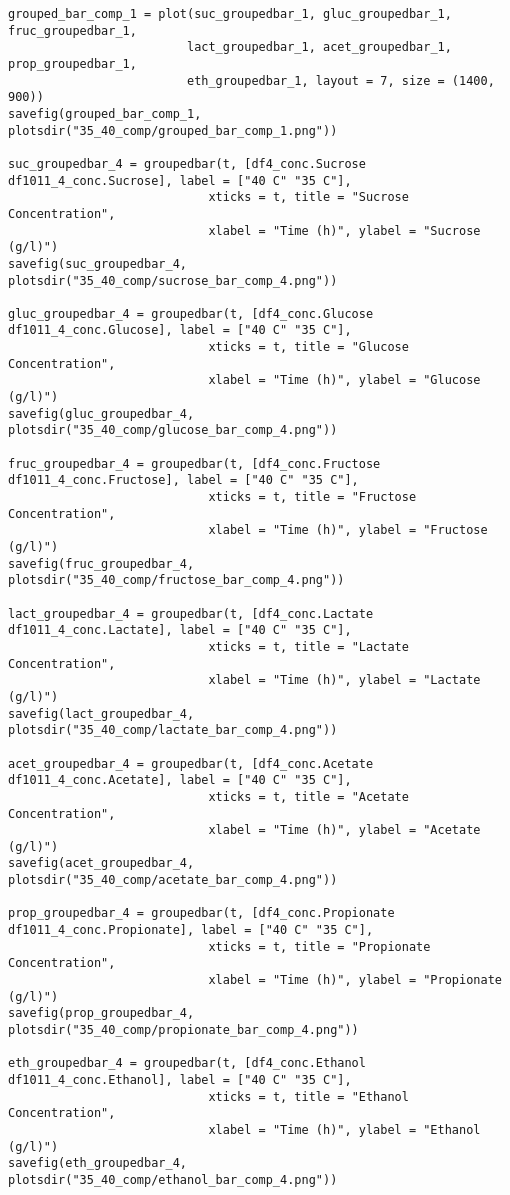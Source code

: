 \documentclass[11pt]{article}
\begin{document}
\begin{verbatim}
grouped_bar_comp_1 = plot(suc_groupedbar_1, gluc_groupedbar_1, fruc_groupedbar_1,
                         lact_groupedbar_1, acet_groupedbar_1, prop_groupedbar_1,
                         eth_groupedbar_1, layout = 7, size = (1400, 900))
savefig(grouped_bar_comp_1, plotsdir("35_40_comp/grouped_bar_comp_1.png"))

suc_groupedbar_4 = groupedbar(t, [df4_conc.Sucrose df1011_4_conc.Sucrose], label = ["40 C" "35 C"],
                            xticks = t, title = "Sucrose Concentration",
                            xlabel = "Time (h)", ylabel = "Sucrose (g/l)")
savefig(suc_groupedbar_4, plotsdir("35_40_comp/sucrose_bar_comp_4.png"))

gluc_groupedbar_4 = groupedbar(t, [df4_conc.Glucose df1011_4_conc.Glucose], label = ["40 C" "35 C"],
                            xticks = t, title = "Glucose Concentration",
                            xlabel = "Time (h)", ylabel = "Glucose (g/l)")
savefig(gluc_groupedbar_4, plotsdir("35_40_comp/glucose_bar_comp_4.png"))

fruc_groupedbar_4 = groupedbar(t, [df4_conc.Fructose df1011_4_conc.Fructose], label = ["40 C" "35 C"],
                            xticks = t, title = "Fructose Concentration",
                            xlabel = "Time (h)", ylabel = "Fructose (g/l)")
savefig(fruc_groupedbar_4, plotsdir("35_40_comp/fructose_bar_comp_4.png"))

lact_groupedbar_4 = groupedbar(t, [df4_conc.Lactate df1011_4_conc.Lactate], label = ["40 C" "35 C"],
                            xticks = t, title = "Lactate Concentration",
                            xlabel = "Time (h)", ylabel = "Lactate (g/l)")
savefig(lact_groupedbar_4, plotsdir("35_40_comp/lactate_bar_comp_4.png"))

acet_groupedbar_4 = groupedbar(t, [df4_conc.Acetate df1011_4_conc.Acetate], label = ["40 C" "35 C"],
                            xticks = t, title = "Acetate Concentration",
                            xlabel = "Time (h)", ylabel = "Acetate (g/l)")
savefig(acet_groupedbar_4, plotsdir("35_40_comp/acetate_bar_comp_4.png"))

prop_groupedbar_4 = groupedbar(t, [df4_conc.Propionate df1011_4_conc.Propionate], label = ["40 C" "35 C"],
                            xticks = t, title = "Propionate Concentration",
                            xlabel = "Time (h)", ylabel = "Propionate (g/l)")
savefig(prop_groupedbar_4, plotsdir("35_40_comp/propionate_bar_comp_4.png"))

eth_groupedbar_4 = groupedbar(t, [df4_conc.Ethanol df1011_4_conc.Ethanol], label = ["40 C" "35 C"],
                            xticks = t, title = "Ethanol Concentration",
                            xlabel = "Time (h)", ylabel = "Ethanol (g/l)")
savefig(eth_groupedbar_4, plotsdir("35_40_comp/ethanol_bar_comp_4.png"))


\end{verbatim}
\end{document}
